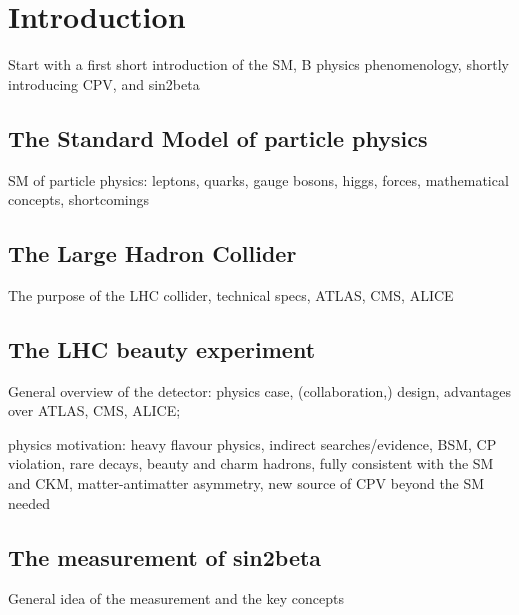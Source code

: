 
\chapter{Introduction}
Start with a first short introduction of the SM, B physics phenomenology, shortly introducing CPV, and sin2beta

\section{The Standard Model of particle physics}
SM of particle physics: leptons, quarks, gauge bosons, higgs, forces, mathematical concepts, shortcomings 

\section{The Large Hadron Collider}
The purpose of the LHC collider, technical specs, ATLAS, CMS, ALICE

\section{The LHC beauty experiment}
General overview of the detector: physics case, (collaboration,) design, advantages over ATLAS, CMS, ALICE; 

physics motivation:
heavy flavour physics, indirect searches/evidence, BSM, CP violation, rare decays, beauty and charm hadrons, fully consistent with the SM and CKM, matter-antimatter asymmetry, new source of CPV beyond the SM needed

\section{The measurement of sin2beta}
General idea of the measurement and the key concepts
